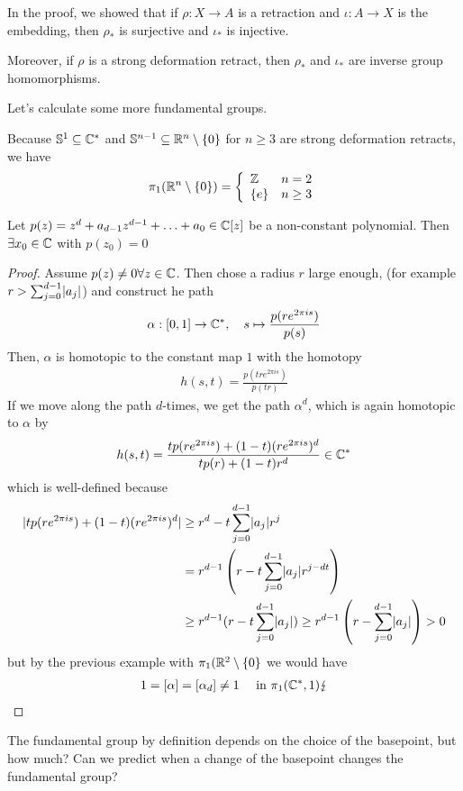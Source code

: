 In the proof, we showed that if $\rho: X \to A$ is a retraction and $\iota: A \to  X$ is the embedding, then $\rho_{\ast}$ is surjective and $\iota_{\ast}$ is injective.

Moreover, if $\rho$ is a strong deformation retract, then $\rho_{\ast}$ and $\iota_{\ast}$ are inverse group homomorphisms.


Let's calculate some more fundamental groups.
\begin{ex}[]\label{ex:homotopy-of-spheres}
  Because $\mathbb{S}^{1} \subseteq \mathbb{C}^{\ast}$ and
  $\mathbb{S}^{n-1} \subseteq \mathbb{R}^{n} \setminus \{0\}$ for $n \geq 3$ 
  are strong deformation retracts, we have
\begin{align*}
  \pi_1(\mathbb{R}^{n} \setminus \{0\}) = \left\{\begin{array}{ll}
    \mathbb{Z} & n = 2\\
    \{e\} & n \geq 3
  \end{array} \right.
\end{align*}
\end{ex}


\begin{thm}
  Let $p(z) = z^{d} + a_{d-1}z^{d-1} + \ldots + a_0 \in \mathbb{C}[z]$ be a non-constant polynomial.
  Then $\exists x_0 \in \mathbb{C}$ with $p(z_0) = 0$
\end{thm}
\begin{proof}
  Assume $p(z) \neq 0 \forall z \in \mathbb{C}$. 
  Then chose a radius $r$ large enough, (for example $r > \sum_{j=0}^{d-1}\abs{a_j}$) and construct he path
  \begin{align*}
    \alpha: [0,1] \to \mathbb{C}^{\ast}, \quad s \mapsto  \frac{p(re^{2 \pi i s})}{p(s)}
  \end{align*}
  Then, $\alpha$ is homotopic to the constant map $1$ with the homotopy
  \begin{align*}
    h(s,t) = \frac{p(tre^{2 \pi i s})}{p(tr)}
  \end{align*}
  If we move along the path $d$-times, we get the path $\alpha^{d}$, which is again homotopic to $\alpha$ by
  \begin{align*}
    h(s,t) = \frac{tp(re^{2 \pi i s}) + (1-t)(re^{2 \pi i s})^{d}}{tp(r) + (1-t) r^{d}} \in \mathbb{C}^{\ast}
  \end{align*}
  which is well-defined because
  \begin{align*}
    \abs{
      tp(re^{2 \pi i s}) + (1-t)(re^{2 \pi i s})^{d}
    }
    &\geq r^{d} - t \sum_{j=0}^{d -1}\abs{a_j}r^{j} \\
    &=
    r^{d-1}\left(r - t \sum_{j=0}^{d-1}\abs{a_j} r^{j - dt} \right)\\
    &\geq
    r^{d-1}(r - t \sum_{j=0}^{d-1}\abs{a_j}) \geq r^{d-1}\left(r - \sum_{j=0}^{d-1}\abs{a_j}\right) > 0
  \end{align*}
  but by the previous example with $\pi_1(\mathbb{R}^{2} \setminus \{0\}$ we would have
  \begin{align*}
    1 = [\alpha] = [\alpha_d] \neq 1 \quad \text{ in } \pi_1(\mathbb{C}^{\ast},1) \lightning
  \end{align*}
\end{proof}


The fundamental group by definition depends on the choice of the basepoint, but how much?
Can we predict when a change of the basepoint changes the fundamental group?

